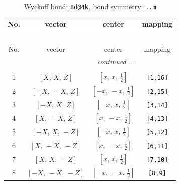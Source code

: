 \documentclass[fleqn,8pt]{jsarticle}
\begin{document}
\begin{longtable}{cccc}
\caption{Wyckoff bond: {\tt 8d@4k}, bond symmetry: {\tt ..m}}
 \\
 \hline \hline
No. & vector & center & mapping \\ \hline \endfirsthead

\multicolumn{3}{l}{\tablename\ \thetable{}} \\
 \hline \hline
No. & vector & center & mapping \\ \hline \endhead

 \hline \hline
\multicolumn{3}{r}{\footnotesize\it continued ...} \\ \endfoot

 \hline \hline
\multicolumn{3}{r}{} \\ \endlastfoot

1 & $\left[ X,\, X,\, Z \right]$ & $\left[ x,\, x,\, \frac{1}{2} \right]$ & {\tt [1,16]} \\ \hline
2 & $\left[ - X,\, - X,\, Z \right]$ & $\left[ - x,\, - x,\, \frac{1}{2} \right]$ & {\tt [2,15]} \\ \hline
3 & $\left[ - X,\, X,\, Z \right]$ & $\left[ - x,\, x,\, \frac{1}{2} \right]$ & {\tt [3,14]} \\ \hline
4 & $\left[ X,\, - X,\, Z \right]$ & $\left[ x,\, - x,\, \frac{1}{2} \right]$ & {\tt [4,13]} \\ \hline
5 & $\left[ - X,\, X,\, - Z \right]$ & $\left[ - x,\, x,\, \frac{1}{2} \right]$ & {\tt [5,12]} \\ \hline
6 & $\left[ X,\, - X,\, - Z \right]$ & $\left[ x,\, - x,\, \frac{1}{2} \right]$ & {\tt [6,11]} \\ \hline
7 & $\left[ X,\, X,\, - Z \right]$ & $\left[ x,\, x,\, \frac{1}{2} \right]$ & {\tt [7,10]} \\ \hline
8 & $\left[ - X,\, - X,\, - Z \right]$ & $\left[ - x,\, - x,\, \frac{1}{2} \right]$ & {\tt [8,9]} \\
\end{longtable}
\renewcommand{\arraystretch}{1.2}
\end{document}
